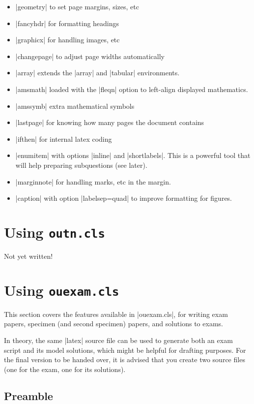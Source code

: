 \documentclass[a4paper]{ltxguide}
\newcommand\3{\unskip\enspace\fbox{\fontsize{4}{4}\selectfont NEW 3.0}}
\begin{document}
\begin{itemize}
\item |geometry| to set page margins, sizes, etc
\item |fancyhdr| for formatting headings
\item |graphicx| for handling images, etc
\item |changepage| to adjust page widths automatically
\item |array| extends the |array| and |tabular| environments.
\item |amsmath| loaded with the |fleqn| option to left-align displayed mathematics.
\item |amssymb| extra mathematical symbols
\item |lastpage| for knowing how many pages the document contains
\item |ifthen| for internal latex coding
\item |enumitem| with options |inline| and |shortlabels|. This is a powerful tool that will help preparing subquestions (see later).
\item |marginnote| for handling marks, etc in the margin.
\item |caption| with option |labelsep=quad| to improve formatting for figures.
\end{itemize}

%
%
%
%
%
%
%
%
%
%
\section{Using \texttt{outn.cls}}
Not yet written!

%
%
%
%
%
%
%
%
%
%
\section{Using \texttt{ouexam.cls}}

This section covers the features available in |ouexam.cls|, for writing exam papers, specimen (and second specimen) papers, and solutions to exams. 

In theory, the same |latex| source file can be used to generate both an exam script and its model solutions, which might be helpful for drafting purposes. For the final version to be handed over, it is advised that you create two source files (one for the exam, one for its solutions).

\subsection{Preamble}
\end{document}
